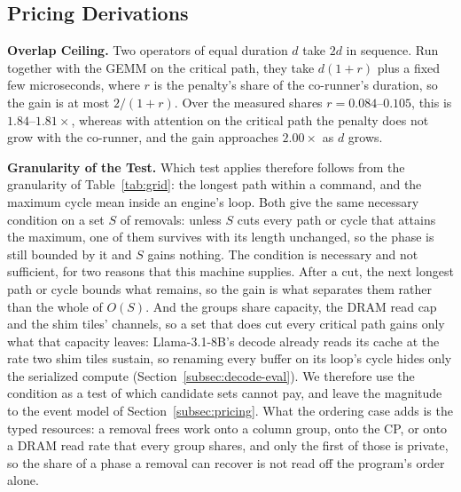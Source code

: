 \subsection{Pricing Derivations}
\label{app:pricing-derivations}

\textbf{Overlap Ceiling.}
Two operators of equal duration $d$ take $2d$ in sequence.
Run together with the GEMM on the critical path, they take $d(1 + r)$ plus a fixed few microseconds, where $r$ is the penalty's share of the co-runner's duration, so the gain is at most $2 / (1 + r)$.
Over the measured shares $r = 0.084$--$0.105$, this is $1.84$--$1.81\times$, whereas with attention on the critical path the penalty does not grow with the co-runner, and the gain approaches $2.00\times$ as $d$ grows.

\textbf{Granularity of the Test.}
Which test applies therefore follows from the granularity of Table~\ref{tab:grid}: the longest path within a command, and the maximum cycle mean inside an engine's loop.
Both give the same necessary condition on a set $S$ of removals: unless $S$ cuts every path or cycle that attains the maximum, one of them survives with its length unchanged, so the phase is still bounded by it and $S$ gains nothing.
The condition is necessary and not sufficient, for two reasons that this machine supplies.
After a cut, the next longest path or cycle bounds what remains, so the gain is what separates them rather than the whole of $O(S)$.
And the groups share capacity, the DRAM read cap and the shim tiles' channels, so a set that does cut every critical path gains only what that capacity leaves: Llama-3.1-8B's decode already reads its cache at the rate two shim tiles sustain, so renaming every buffer on its loop's cycle hides only the serialized compute (Section~\ref{subsec:decode-eval}).
We therefore use the condition as a test of which candidate sets cannot pay, and leave the magnitude to the event model of Section~\ref{subsec:pricing}.
What the ordering case adds is the typed resources: a removal frees work onto a column group, onto the CP, or onto a DRAM read rate that every group shares, and only the first of those is private, so the share of a phase a removal can recover is not read off the program's order alone.

